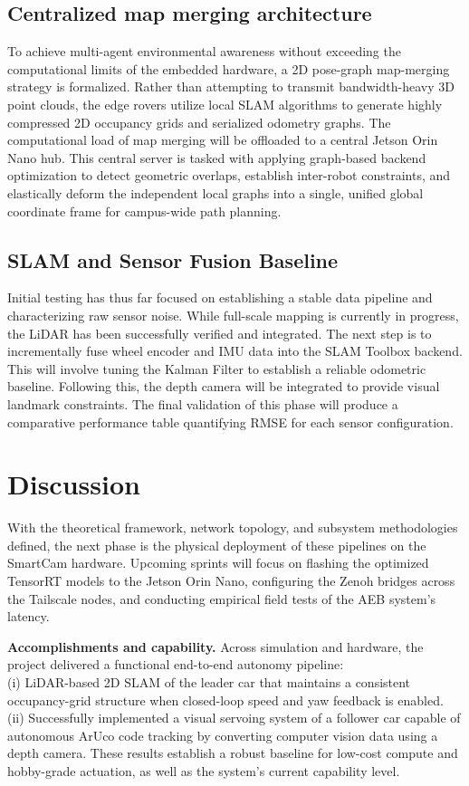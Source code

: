 \documentclass[journal,transmag]{IEEEtran}
\begin{document}
\subsection{Centralized map merging architecture}
To achieve multi-agent environmental awareness without exceeding the computational limits of the embedded hardware, a 2D pose-graph map-merging strategy is formalized. Rather than attempting to transmit bandwidth-heavy 3D point clouds, the edge rovers utilize local SLAM algorithms to generate highly compressed 2D occupancy grids and serialized odometry graphs. The computational load of map merging will be offloaded to a central Jetson Orin Nano hub. This central server is tasked with applying graph-based backend optimization to detect geometric overlaps, establish inter-robot constraints, and elastically deform the independent local graphs into a single, unified global coordinate frame for campus-wide path planning.

\subsection{SLAM and Sensor Fusion Baseline}
Initial testing has thus far focused on establishing a stable data pipeline and characterizing raw sensor noise. While full-scale mapping is currently in progress, the LiDAR has been successfully verified and integrated. The next step is to incrementally fuse wheel encoder and IMU data into the SLAM Toolbox backend. This will involve tuning the Kalman Filter to establish a reliable odometric baseline. Following this, the depth camera will be integrated to provide visual landmark constraints. The final validation of this phase will produce a comparative performance table quantifying RMSE for each sensor configuration. 

\section{Discussion}
With the theoretical framework, network topology, and subsystem methodologies defined, the next phase is the physical deployment of these pipelines on the SmartCam hardware. Upcoming sprints will focus on flashing the optimized TensorRT models to the Jetson Orin Nano, configuring the Zenoh bridges across the Tailscale nodes, and conducting empirical field tests of the AEB system's latency.



\noindent\textbf{Accomplishments and capability.} Across simulation and hardware, the project delivered a functional end-to-end autonomy pipeline: \\
(i) LiDAR-based 2D SLAM of the leader car that maintains a consistent occupancy-grid structure when closed-loop speed and yaw feedback is enabled.\\
(ii) Successfully implemented a visual servoing system of a follower car capable of autonomous ArUco code tracking by converting computer vision data using a depth camera.
These results establish a robust baseline for low-cost compute and hobby-grade actuation, as well as the system's current capability level.
\end{document}
